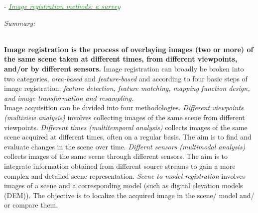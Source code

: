 \documentclass[]{article}
\newcommand{\paperentry}[4]{
            \hangindent=1cm
            \cite{#1} - \href{run:../References/#3}{\textcolor{ForestGreen}{\textit{#2}}}
            
            \noindent            
            \begin{minipage}[t]{0.1\linewidth}\hfill\end{minipage}
            \begin{minipage}[t]{0.8\linewidth}\textcolor{NavyBlue}{{\textit{Summary:}}}#4\end{minipage}
            \vspace{.25cm}
          }
\begin{document}
		\paperentry{Zitova2003SurveyImageRegistrationMethods}
		{Image registration methods: a survey}
		{Fusion/Reviews/Zitova2003SurveyImageRegistrationMethods.pdf}
		{}\\
		\textbf{Image registration is the process of overlaying images (two or more) of the same scene taken at different times, from different viewpoints, and/or by different sensors.}  Image registration can broadly be broken into two categories, \textit{area-based} and \textit{feature-based} and according to four basic steps of image registration: \textit{feature detection, feature matching, mapping function design, and image transformation and resampling.} \\
		\noindent
		Image acquisition can be divided into four methodologies.  \textit{Different viewpoints (multiview analysis)} involves collecting images of the same scene from different viewpoints.  \textit{Different times (multitemporal analysis)} collects images of the same scene acquired at different times, often on a regular basis.  The aim  is to find and  evaluate changes in the scene over time.  \textit{Differnt sensors (multimodal analysis)} collects images of the same scene through different sensors.  The aim is to integrate information obtained from different source streams to gain a more complex and detailed scene representation.  \textit{Scene to model registration} involves images of a scene and a corresponding model (such as digital elevation models (DEM)).  The objective is to localize the acquired image in the scene/ model and/ or compare them.\\
		\noindent
\end{document}
